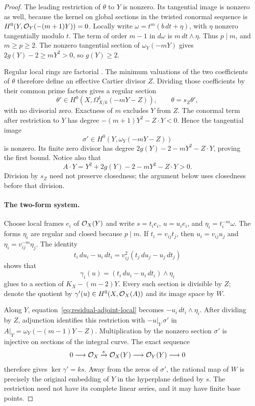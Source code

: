 \begin{proof}
The leading restriction of $\theta$ to $Y$ is nonzero. Its tangential
image is nonzero as well, because the kernel on global sections in
the twisted conormal sequence is
$H^0(Y,\mathcal O_Y(-(m+1)Y))=0$. Locally write
$\omega=t^m(b\,dt+\eta)$, with $\eta$ nonzero tangentially modulo $t$.
The term of order $m-1$ in $d\omega$ is $m\,dt\wedge\eta$.
Thus $p\mid m$, and $m\geq p\geq2$.
The nonzero tangential section of $\omega_Y(-mY)$ gives
$2g(Y)-2\geq mY^2>0$, so $g(Y)\geq2$.

Regular local rings are factorial
\cite[Lemma~15.123.2, Tag~0AG0]{Stacks}.
The minimum valuations of the two coefficients of $\theta$ therefore
define an effective Cartier divisor $Z$. Dividing those coefficients
by their common prime factors gives a regular section
\[
 \theta'\in H^0(X,\Omega^1_{X/k}(-mY-Z)),\qquad
 \theta=s_Z\theta',
\]
with no divisorial zero. Exactness of $m$ excludes $Y$ from $Z$.
The conormal term after restriction to $Y$ has degree
$-(m+1)Y^2-Z\cdot Y<0$. Hence the tangential image
\[
 \sigma'\in H^0(Y,\omega_Y(-mY-Z))
\]
is nonzero. Its finite zero divisor has degree
$2g(Y)-2-mY^2-Z\cdot Y$, proving the first bound. Notice also that
\[
 A\cdot Y=Y^2+2g(Y)-2-mY^2-Z\cdot Y>0.
\]
Division by $s_Z$ need not preserve closedness; the argument below
uses closedness before that division.

\paragraph{The two-form system.}
Choose local frames $e_i$ of $\mathcal O_X(Y)$ and write
$s=t_i e_i$, $u=u_i e_i$, and $\eta_i=t_i^{-m}\omega$.
The forms $\eta_i$ are regular and closed because $p\mid m$.
If $t_i=v_{ij}t_j$, then $u_i=v_{ij}u_j$ and
$\eta_i=v_{ij}^{-m}\eta_j$. The identity
\[
 t_i\,du_i-u_i\,dt_i
 =v_{ij}^2(t_j\,du_j-u_j\,dt_j)
\]
shows that
\begin{equation}\label{eq:residual-adjoint-local}
 \gamma_i(u)=(t_i\,du_i-u_i\,dt_i)\wedge\eta_i
\end{equation}
glues to a section of $K_X-(m-2)Y$.
Every such section is divisible by $Z$; denote the quotient by
$\gamma'(u)\in H^0(X,\mathcal O_X(A))$ and its image space by $W$.

Along $Y$, equation~\eqref{eq:residual-adjoint-local} becomes
$-u_i\,dt_i\wedge\eta_i$. After dividing by $Z$, adjunction identifies
this restriction with $-u|_Y\,\sigma'$ in
$A|_Y=\omega_Y(-(m-1)Y-Z)$.
Multiplication by the nonzero section $\sigma'$ is injective on
sections of the integral curve. The exact sequence
\[
 0\longrightarrow\mathcal O_X\xrightarrow{s}\mathcal O_X(Y)
 \longrightarrow\mathcal O_Y(Y)\longrightarrow0
\]
therefore gives $\ker\gamma'=ks$. Away from the zeros of $\sigma'$,
the rational map of $W$ is precisely the original embedding of $Y$
in the hyperplane defined by $s$. The restriction need not have its
complete linear series, and it may have finite base points.


\end{proof}
